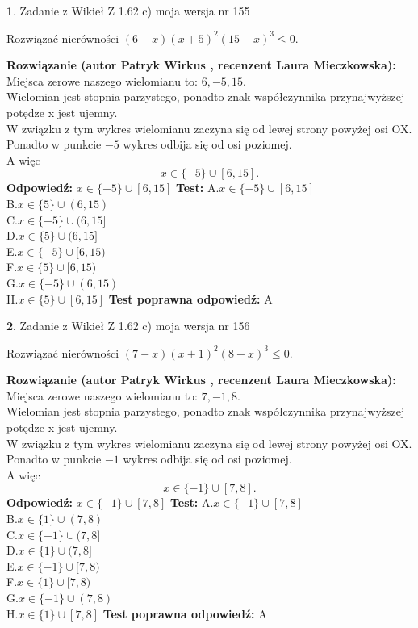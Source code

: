 \documentclass[12pt, a4paper]{article}
\theoremstyle{definition} %
\newtheorem{zad}{}
\newcommand{\zadStart}[1]{\begin{zad}#1\newline}
\newcommand{\zadStop}{\end{zad}}
\newcommand{\rozwStart}[2]{\noindent \textbf{Rozwiązanie (autor #1 , recenzent #2): }\newline}
\newcommand{\rozwStop}{\newline}
\newcommand{\odpStart}{\noindent \textbf{Odpowiedź:}\newline}
\newcommand{\odpStop}{\newline}
\newcommand{\testStart}{\noindent \textbf{Test:}\newline}
\newcommand{\testStop}{\newline}
\newcommand{\kluczStart}{\noindent \textbf{Test poprawna odpowiedź:}\newline}
\newcommand{\kluczStop}{\newline}
\begin{document}
\zadStart{Zadanie z Wikieł Z 1.62 c) moja wersja nr 155}

Rozwiązać nierówności $(6-x)(x+5)^{2}(15-x)^{3}\le0$.
\zadStop
\rozwStart{Patryk Wirkus}{Laura Mieczkowska}
Miejsca zerowe naszego wielomianu to: $6, -5, 15$.\\
Wielomian jest stopnia parzystego, ponadto znak współczynnika przy\linebreak najwyższej potędze x jest ujemny.\\ W związku z tym wykres wielomianu zaczyna się od lewej strony powyżej osi OX.\\
Ponadto w punkcie $-5$ wykres odbija się od osi poziomej.\\
A więc $$x \in \{-5\} \cup [6,15].$$
\rozwStop
\odpStart
$x \in \{-5\} \cup [6,15]$
\odpStop
\testStart
A.$x \in \{-5\} \cup [6,15]$\\
B.$x \in \{5\} \cup (6,15)$\\
C.$x \in \{-5\} \cup (6,15]$\\
D.$x \in \{5\} \cup (6,15]$\\
E.$x \in \{-5\} \cup [6,15)$\\
F.$x \in \{5\} \cup [6,15)$\\
G.$x \in \{-5\} \cup (6,15)$\\
H.$x \in \{5\} \cup [6,15]$
\testStop
\kluczStart
A
\kluczStop



\zadStart{Zadanie z Wikieł Z 1.62 c) moja wersja nr 156}

Rozwiązać nierówności $(7-x)(x+1)^{2}(8-x)^{3}\le0$.
\zadStop
\rozwStart{Patryk Wirkus}{Laura Mieczkowska}
Miejsca zerowe naszego wielomianu to: $7, -1, 8$.\\
Wielomian jest stopnia parzystego, ponadto znak współczynnika przy\linebreak najwyższej potędze x jest ujemny.\\ W związku z tym wykres wielomianu zaczyna się od lewej strony powyżej osi OX.\\
Ponadto w punkcie $-1$ wykres odbija się od osi poziomej.\\
A więc $$x \in \{-1\} \cup [7,8].$$
\rozwStop
\odpStart
$x \in \{-1\} \cup [7,8]$
\odpStop
\testStart
A.$x \in \{-1\} \cup [7,8]$\\
B.$x \in \{1\} \cup (7,8)$\\
C.$x \in \{-1\} \cup (7,8]$\\
D.$x \in \{1\} \cup (7,8]$\\
E.$x \in \{-1\} \cup [7,8)$\\
F.$x \in \{1\} \cup [7,8)$\\
G.$x \in \{-1\} \cup (7,8)$\\
H.$x \in \{1\} \cup [7,8]$
\testStop
\kluczStart
A
\kluczStop
\end{document}
